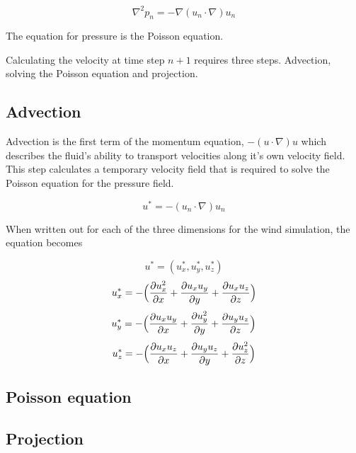 $$ \nabla^2 p_n = - \nabla (u_n \cdot \nabla)u_n $$

The equation for pressure is the Poisson equation. 

Calculating the velocity at time step $n+1$ requires three steps. Advection, 
solving the Poisson equation and projection.

\subsection{Advection}

Advection is the first term of the momentum equation, $-(u \cdot \nabla)u$ which
describes the fluid's ability to transport velocities along it's own velocity 
field. This step calculates a temporary velocity field that is required to solve
the Poisson equation for the pressure field.

$$u^* = -(u_n \cdot \nabla)u_n$$

When written out for each of the three dimensions for the wind simulation, the
equation becomes

$$ u^* = (u^*_x, u^*_y, u^*_z) $$
$$ u^*_x = - \Big( \frac{\partial u_x^2}{\partial x} + \frac{\partial u_x u_y}{\partial y} + \frac{\partial u_x u_z}{\partial z}\Big) $$
$$ u^*_y = - \Big( \frac{\partial u_x u_y}{\partial x} + \frac{\partial u_y^2}{\partial y} + \frac{\partial u_y u_z}{\partial z}\Big) $$
$$ u^*_z = - \Big( \frac{\partial u_x u_z}{\partial x} + \frac{\partial u_y u_z}{\partial y} + \frac{\partial u_z^2}{\partial z}\Big) $$

\subsection{Poisson equation}

\subsection{Projection}

